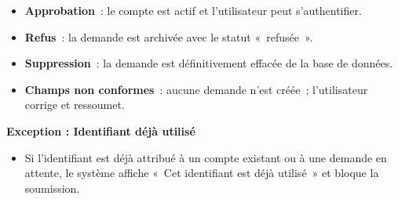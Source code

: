 \documentclass[11pt]{article}
\begin{document}
\begin{description}[leftmargin=4.2cm, style=nextline]
    \item[Postconditions]
    \begin{itemize}[leftmargin=*, nosep]
        \item \textbf{Approbation}~: le compte est actif et l'utilisateur peut
              s'authentifier.
        \item \textbf{Refus}~: la demande est archivée avec le statut
              «~refusée~».
        \item \textbf{Suppression}~: la demande est définitivement effacée
              de la base de données.
        \item \textbf{Champs non conformes}~: aucune demande n'est créée~;
              l'utilisateur corrige et ressoumet.
    \end{itemize}

    \item[Exceptions]
    \textbf{Exception : Identifiant déjà utilisé}
    \begin{itemize}[leftmargin=*, nosep]
        \item Si l'identifiant est déjà attribué à un compte existant ou à
              une demande en attente, le système affiche
              «~Cet identifiant est déjà utilisé~» et bloque la soumission.
    \end{itemize}
\end{description}
\end{document}
